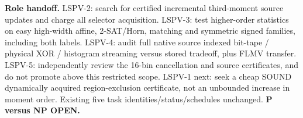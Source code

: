 \documentclass[10pt]{article}
\begin{document}
\noindent\textbf{Role handoff.} LSPV-2: search for certified incremental third-moment source updates and charge all selector acquisition. LSPV-3: test higher-order statistics on easy high-width affine, 2-SAT/Horn, matching and symmetric signed families, including both labels. LSPV-4: audit full native source indexed bit-tape / physical XOR / histogram streaming versus stored tradeoff, plus FLMV transfer. LSPV-5: independently review the 16-bin cancellation and source certificates, and do not promote above this restricted scope. LSPV-1 next: seek a cheap SOUND dynamically acquired region-exclusion certificate, not an unbounded increase in moment order. Existing five task identities/status/schedules unchanged. \textbf{P versus NP OPEN.}
\end{document}

